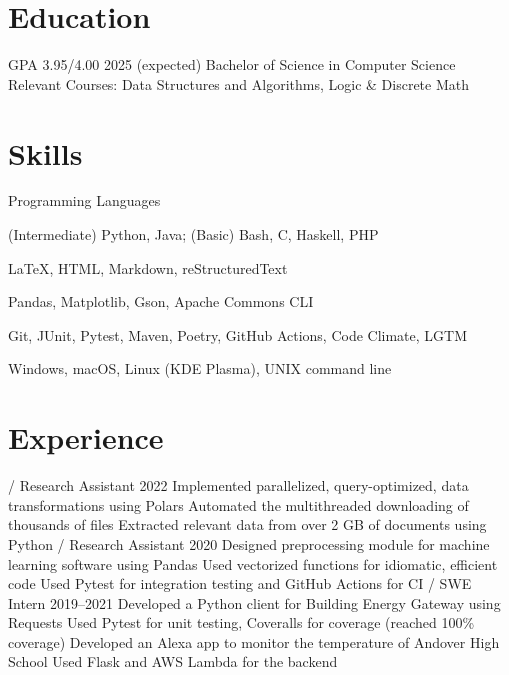 \section{Education}
\begin{doutline}
     GPA 3.95/4.00 \hfill 2025 (expected)
        \2 Bachelor of Science in Computer Science
        \2 Relevant Courses: Data Structures and Algorithms, Logic \& Discrete Math
\end{doutline}

\section{Skills}
\begin{labeling}{Programming Languages}
    \item [Programming Languages] (Intermediate) Python, Java; (Basic) Bash, C, Haskell, PHP
    \item [Markup Languages] \LaTeX, HTML, Markdown, reStructuredText
    \item [Libraries] Pandas, Matplotlib, Gson, Apache Commons CLI
    \item [Tools] Git, JUnit, Pytest, Maven, Poetry, GitHub Actions, Code Climate, LGTM
    \item [Operating Systems] Windows, macOS, Linux (KDE Plasma), UNIX command line
\end{labeling}

\section{Experience}
\begin{doutline}
     / Research Assistant \hfill 2022
        \2 Implemented parallelized, query-optimized, data transformations using Polars
        \2 Automated the multithreaded downloading of thousands of files
        \2 Extracted relevant data from over 2 GB of documents using Python
     / Research Assistant \hfill 2020
        \2 Designed preprocessing module for machine learning software using Pandas
        \2 Used vectorized functions for idiomatic, efficient code
        \2 Used Pytest for integration testing and GitHub Actions for CI
     / SWE Intern \hfill 2019--2021
        \2 Developed a Python client for Building Energy Gateway using Requests
        \2 Used Pytest for unit testing, Coveralls for coverage (reached 100\% coverage)
        \2 Developed an Alexa app to monitor the temperature of Andover High School
        \2 Used Flask and AWS Lambda for the backend
\end{doutline}

